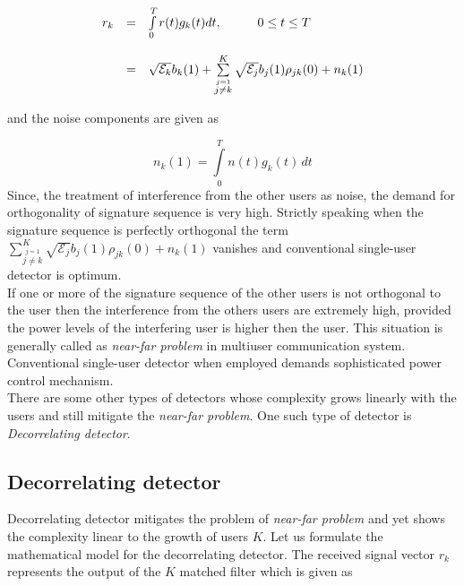 \begin{eqnarray}
\begin{array}{lll}
r_k&=&\int\limits_{0}^{T} r(t)g_k(t)dt,\hspace{10mm} 0 \leq t \leq T \\ \\
&=&\sqrt{\mathcal{E}_k}b_k(1)+\sum\limits_{\stackrel{j=1}{j \neq k}}^{K} \sqrt{\mathcal{E}_j}b_j(1)\rho_{jk}(0)+n_k(1)
\end{array}
\end{eqnarray}

and the noise components are given as

\begin{equation}
n_k(1)=\int\limits_{0}^{T}n(t)g_k(t)\,dt
\end{equation}
Since, the treatment of interference from the other users as noise, the demand for orthogonality of signature sequence is very high. Strictly speaking when the signature sequence is perfectly orthogonal the term\\ $\sum\limits_{\stackrel{j=1}{j \neq k}}^{K}\sqrt{\mathcal{E}_j}b_j(1)\rho_{jk}(0)+n_k(1)$ vanishes and conventional single-user detector is optimum.\\

If one or more of the signature sequence of the other users is not orthogonal to the user then the interference from the others users are extremely high, provided the power levels of the interfering user is higher then the user. This situation is generally called as \textit{near-far problem} in multiuser communication system. Conventional single-user detector when employed demands sophisticated power control mechanism. \\

There are some other types of detectors whose complexity grows linearly with the users and still mitigate the \textit{near-far problem}. One such type of detector is \textit{Decorrelating detector}.

\subsection{Decorrelating detector}

Decorrelating detector mitigates the problem of \textit{near-far problem} and yet shows the complexity linear to the growth of users $K$. Let us formulate the mathematical model for the decorrelating detector. The received signal vector $r_k$ represents the output of the $K$ matched filter which is given as

